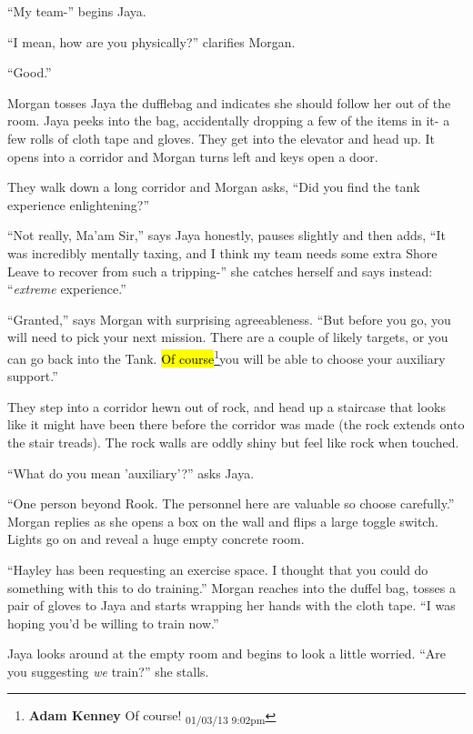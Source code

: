 ``My team-'' begins Jaya.

``I mean, how are you physically?'' clarifies Morgan.

``Good.''

Morgan tosses Jaya the dufflebag and indicates she should follow her out of the room.  Jaya peeks into the bag, accidentally dropping a few of the items in it- a few rolls of cloth tape and gloves.  They get into the elevator and head up.  It opens into a corridor and Morgan turns left and keys open a door. 

They walk down a long corridor and Morgan asks, ``Did you find the tank experience enlightening?''

``Not really, Ma'am Sir,'' says Jaya honestly, pauses slightly and then adds, ``It was incredibly mentally taxing, and I think my team needs some extra Shore Leave to recover from such a tripping-'' she catches herself and says instead: ``\textit{extreme} experience.''

``Granted,'' says Morgan with surprising agreeableness. ``But before you go, you will need to pick your next mission.  There are a couple of likely targets, or you can go back into the Tank.  \hl{Of course}\footnote{\textbf{Adam Kenney }Of course! \textsubscript{01/03/13 9:02pm}}you will be able to choose your auxiliary support.''



They step into a corridor hewn out of rock, and head up a staircase that looks like it might have been there before the corridor was made (the rock extends onto the stair treads).  The rock walls are oddly shiny but feel like rock when touched.  



``What do you mean 'auxiliary'?'' asks Jaya.

``One person beyond Rook.  The personnel here are valuable so choose carefully.''  Morgan replies as she opens a box on the wall and flips a large toggle switch.  Lights go on and reveal a huge empty concrete room.



``Hayley has been requesting an exercise space.  I thought that you could do something with this to do training.''  Morgan reaches into the duffel bag, tosses a pair of gloves to Jaya and starts wrapping her hands with the cloth tape.  ``I was hoping you'd be willing to train now.''



Jaya looks around at the empty room and begins to look a little worried.  ``Are you suggesting \textit{we} train?'' she stalls.

